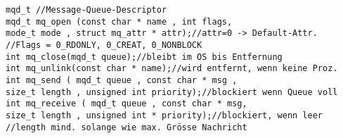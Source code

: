 \begin{verbatim}
mqd_t //Message-Queue-Descriptor
mqd_t mq_open (const char * name , int flags,
mode_t mode , struct mq_attr * attr);//attr=0 -> Default-Attr.
//Flags = 0_RDONLY, 0_CREAT, 0_NONBLOCK
int mq_close(mqd_t queue);//bleibt im OS bis Entfernung
int mq_unlink(const char * name);//wird entfernt, wenn keine Proz.
int mq_send ( mqd_t queue , const char * msg ,
size_t length , unsigned int priority);//blockiert wenn Queue voll
int mq_receive ( mqd_t queue , const char * msg,
size_t length , unsigned int * priority);//blockiert, wenn leer
//length mind. solange wie max. Grösse Nachricht
\end{verbatim}


